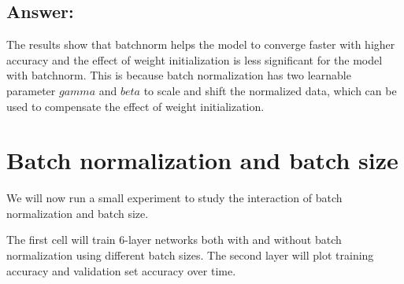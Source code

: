 \documentclass[11pt]{article}
\begin{document}
\hypertarget{answer}{%
\subsection{Answer:}\label{answer}}

The results show that batchnorm helps the model to converge faster with
higher accuracy and the effect of weight initialization is less
significant for the model with batchnorm. This is because batch
normalization has two learnable parameter \(gamma\) and \(beta\) to
scale and shift the normalized data, which can be used to compensate the
effect of weight initialization.

    \hypertarget{batch-normalization-and-batch-size}{%
\section{Batch normalization and batch
size}\label{batch-normalization-and-batch-size}}

We will now run a small experiment to study the interaction of batch
normalization and batch size.

The first cell will train 6-layer networks both with and without batch
normalization using different batch sizes. The second layer will plot
training accuracy and validation set accuracy over time.
\end{document}
